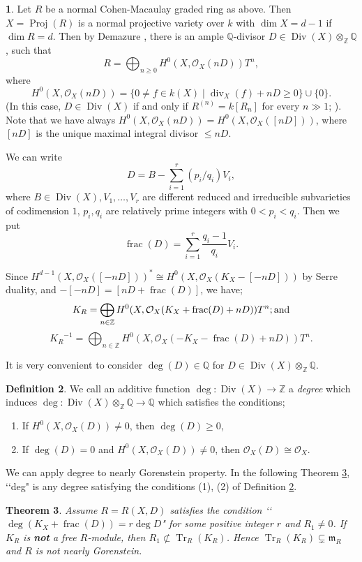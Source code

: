 \documentclass[12pt]{amsart}
\newtheorem{thm}{Theorem}[section]
\theoremstyle{definition}
\newtheorem{defn}[thm]{Definition}
\newtheorem{noname}[thm]{}
\theoremstyle{remark}
\numberwithin{equation}{section}
\DeclareMathOperator{\Proj}{Proj}
\DeclareMathOperator{\Tr}{Tr}
\DeclareMathOperator{\di}{div}
\DeclareMathOperator{\Div}{Div}
\DeclareMathOperator{\FRC}{frac}
\newcommand{\m}{\mathfrak m}
\newcommand{\KiR}{{K_R}^{-1}}
\newcommand{\Z}{\mathbb Z}
\newcommand{\Q}{\mathbb Q}
\newcommand{\bbZ}{\ensuremath{\mathbb Z}}
\newcommand{\bbQ}{\ensuremath{\mathbb Q}}
\newcommand{\cO}{\mathcal O}
\renewcommand{\:}{\colon}
\begin{document}
\begin{noname}\label{3.1}
Let $R$ be a normal Cohen-Macaulay graded ring as above. Then $X=\Proj(R)$ is a normal projective 
variety over $k$ with $\dim X=d-1$ if $\dim R=d$. Then by Demazure \cite{Dem},  
there is an ample $\Q$-divisor $D\in \Div(X)\otimes_{\bbZ}\bbQ$, such that 
\[R = \bigoplus_{n\ge 0} H^0( X,\cO_X( nD))T^n,\] 
where 
\[
H^0( X, \cO_X(nD)) = \{0 \ne f\in k(X)\;|\; \di_X(f) + nD \ge 0\} 
\cup \{0\}. 
\]  
(In this case, $D\in \Div(X)$ if and only if $R^{(n)}=k[R_n]$ for every $n\gg 1$; \cite{GW}). 
Note that we have always $H^0( X, \cO_X(nD)) = H^0( X, \cO_X([nD]))$, where $[nD]$ is the 
unique maximal integral divisor $\le nD$. 
\par
We can write 
\[
D= B - \sum_{i=1}^r (p_i/q_i) V_i,
\] 
where $B\in \Div(X), V_1,\ldots, V_r$ are different reduced and 
irreducible subvarieties of 
codimension $1$,  $p_i, q_i$ are relatively prime integers with  
$0<p_i<q_i$. 
Then we put  
\[
\FRC(D) = \sum_{i=1}^r \dfrac{q_i-1}{q_i} V_i. 
\]
\par 
Since  $H^{d-1}(X, \cO_X([-nD]))^{*} \cong H^0(X, \cO_X(K_X -[-nD]))$
by Serre duality, and   
$- [-nD] = [ nD + \FRC(D)]$,  we have;  
\[K_R = \bigoplus_{n\in \bbZ} H^0(X, \cO_X(K_X + \FRC(D)+ nD)) T^n;{\rm and}\] 
\[\KiR = \bigoplus_{n\in \bbZ} H^0(X, \cO_X(- K_X - \FRC(D)+ nD)) T^n. \] 
\par 
It is very convenient to consider $\deg(D)\in \Q$ for $D\in \Div(X)\otimes_{\Z}\Q$. 
\end{noname}

\begin{defn}\label{degD} 
We call an additive function $\deg : \Div(X) \to \Z$ a {\em degree} 
which induces $\deg :  \Div(X)\otimes_\Z \Q \to \Q$ which satisfies 
the conditions; 
\begin{enumerate}
\item[(1)] If $H^0(X,\cO_X(D))\ne 0$, then $\deg(D)\ge 0$, 
\item[(2)] If $\deg(D)=0$ and $H^0(X,\cO_X(D))\ne 0$, then  
$\cO_X(D)\cong \cO_X$.  
\end{enumerate}
\end{defn}
\par 
We can apply degree to nearly Gorenstein property. In the following Theorem \ref{degD-div}, 
\lq\lq deg" is any degree satisfying the conditions (1), (2) of Definition \ref{degD}. 

\begin{thm}\label{degD-div} Assume $R=R(X,D)$ satisfies the condition 
\lq\lq \; $\deg (K_X+\FRC(D)) =r \deg D$" for some positive 
integer $r$ and  $R_1\ne 0$. If  $K_R$ is {\bf not} a free $R$-module, 
then $R_1 \not\subset \Tr_R(K_R)$. 
Hence $\Tr_R (K_R)\subsetneq \m_R$ 
and $R$ is not nearly Gorenstein. 
\end{thm} 
\end{document}
